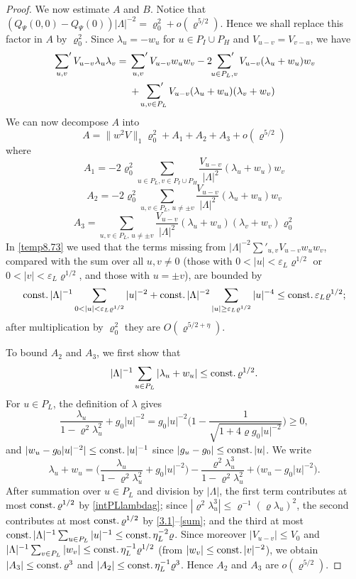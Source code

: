 \documentclass[11pt]{article}
\numberwithin{equation}{section}
\newcommand{\beq}{\begin{equation}}
\newcommand{\eeq}{\end{equation}}
\newcommand\eps{\varepsilon}
\newcommand\const{{\rm const.\, }}
\renewcommand\rho\varrho
\theoremstyle{definition}
\begin{document}
\begin{proof}
We now estimate $A$ and $B$.  Notice that
$
(Q_\Psi(0,0)-Q_\Psi(0))|\Lambda|^{-2}
= \rho_{0}^{2} + o(\rho^{5/2})
$. 
Hence we shall replace this factor in $A$ by $\rho_{0}^{2}$.  
Since  $\lambda_{u}= - w_{u}$ for $u \in P_{I}\cup P_{H}$ and $V_{u-v}=V_{v-u}$, we have
\begin{align*}
\sideset{}{'}\sum_{u,v}V_{u-v}\lambda_u\lambda_v={}&\sideset{}{'}\sum_{u,v}V_{u-v}w_uw_v-2\sideset{}{'}\sum_{u\in P_L,v}V_{u-v}(\lambda_u+w_u)w_v\\
&+\sideset{}{'}\sum_{u, v\in P_L}V_{u-v}(\lambda_u+w_u)(\lambda_v+w_v)
\end{align*}
We can now decompose $A$ into
\beq \label{temp8.73}
A = \|w^2V\|_1 \rho_{0}^{2}+A_{1}+A_{2}+A_{3} + o(\rho^{5/2})
\eeq
where
\[
A_{1}=
-2\rho_{0}^{2} \sum_{u\in P_L,v\in P_I\cup P_H}\frac{V_{u-v}}{|\Lambda|^2}(\lambda_u+w_u)w_v
\]
\[
A_{2}=
-2\rho_{0}^{2} \sum_{u,v\in P_{L},\,u\neq\pm v}\frac{V_{u-v}}{|\Lambda|^2}(\lambda_u+w_u)w_v
\]
\[
A_{3}= \sum_{u,v\in P_L,\,u\neq\pm v}\frac{V_{u-v}}{|\Lambda|^2}(\lambda_u+w_u)(\lambda_v+w_v)\rho_{0}^{2}
\]
In \eqref{temp8.73} we used that the terms missing from $|\Lambda|^{-2}\sum'_{u,v}V_{u-v}w_uw_v$, compared with the sum over all $u,v\neq 0$ (those with $0<|u|<\eps_L\rho^{1/2}$ or $0<|v|<\eps_L\rho^{1/2}$, and those with $u=\pm v$), are bounded by
\[
\const|\Lambda|^{-1}\sum_{0<|u|<\eps_L\rho^{1/2}}|u|^{-2}+\const|\Lambda|^{-2}\sum_{|u|\geq\eps_L\rho^{1/2}}|u|^{-4}\leq \const\eps_L\rho^{1/2};
\]
after multiplication by $\rho_0^2$ they are $O(\rho^{5/2+\eta})$.

To bound $A_2$ and $A_3$, we first show that
\beq\nonumber
|\Lambda|^{-1}\sum_{u\in P_L}|\lambda_u+w_u|\leq\const\rho^{1/2}.
\eeq
For $u\in P_L$, the definition of $\lambda$ gives
\[
\frac{\lambda_u}{1-\rho^2\lambda_u^2}+g_0|u|^{-2}=g_0|u|^{-2}\Big(1-\frac{1}{\sqrt{1+4\rho g_0|u|^{-2}}}\Big)\geq 0,
\]
and $|w_u-g_0|u|^{-2}|\leq\const|u|^{-1}$ since $|g_u-g_0|\leq\const|u|$. We write
\[
\lambda_u+w_u=\Big(\frac{\lambda_u}{1-\rho^2\lambda_u^2}+g_0|u|^{-2}\Big)-\frac{\rho^2\lambda_u^3}{1-\rho^2\lambda_u^2}+\big(w_u-g_0|u|^{-2}\big).
\]
After summation over $u\in P_L$ and division by $|\Lambda|$, the first term contributes at most $\const\rho^{1/2}$ by \eqref{intPLlambdag}; since $|\rho^2\lambda_u^3|\leq\rho^{-1}(\rho\lambda_u)^2$, the second contributes at most $\const\rho^{1/2}$ by \eqref{3.1}--\eqref{sum}; and the third at most $\const|\Lambda|^{-1}\sum_{u\in P_L}|u|^{-1}\leq\const\eta_L^{-2}\rho$. Since moreover $|V_{u-v}|\leq V_0$ and $|\Lambda|^{-1}\sum_{v\in P_L}|w_v|\leq\const\eta_L^{-1}\rho^{1/2}$ (from $|w_v|\leq\const|v|^{-2}$), we obtain $|A_{3}|\leq\const\rho^{3}$ and $|A_{2}|\leq\const\eta_L^{-1}\rho^{3}$. Hence $A_{2}$ and $A_{3}$ are $o(\rho^{5/2})$.


\end{proof}
\end{document}
